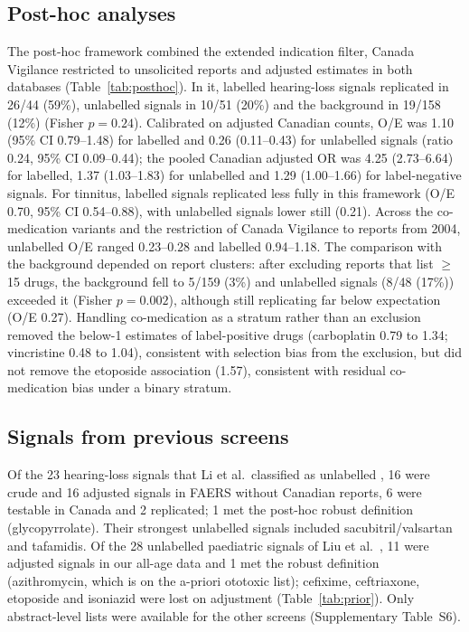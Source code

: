 \subsection{Post-hoc analyses}
The post-hoc framework combined the extended indication filter, Canada Vigilance restricted to unsolicited reports and
adjusted estimates in both databases (Table~\ref{tab:posthoc}). In it, labelled hearing-loss signals replicated in
26/44 (59\%), unlabelled signals in 10/51 (20\%) and the background in 19/158 (12\%)
(Fisher $p=0.24$). Calibrated on adjusted Canadian counts, O/E was 1.10 (95\% CI
0.79--1.48) for labelled and
0.26 (0.11--0.43)
for unlabelled signals (ratio 0.24, 95\% CI
0.09--0.44); the pooled
Canadian adjusted OR was 4.25 (2.73--6.64)
for labelled, 1.37 (1.03--1.83)
for unlabelled and 1.29 (1.00--1.66)
for label-negative signals. For tinnitus, labelled signals replicated less fully in this framework (O/E
0.70, 95\% CI 0.54--0.88),
with unlabelled signals lower still (0.21). Across the co-medication variants and the restriction of Canada Vigilance to reports from 2004,
unlabelled O/E ranged 0.23--0.28 and labelled
0.94--1.18. The comparison with the background depended on
report clusters: after excluding reports that list $\geq$15 drugs, the background fell to 5/159 (3\%) and
unlabelled signals (8/48 (17\%)) exceeded it (Fisher $p=0.002$),
although still replicating far below expectation (O/E 0.27). Handling
co-medication as a stratum rather than an exclusion removed the below-1 estimates of label-positive drugs (carboplatin
0.79 to 1.34; vincristine
0.48 to 1.04), consistent
with selection bias from the exclusion, but did not remove the etoposide association
(1.57), consistent with residual co-medication bias under a binary stratum.

\subsection{Signals from previous screens}
Of the 23 hearing-loss signals that Li et al.\ classified as unlabelled \cite{li2024},
16 were crude and 16 adjusted signals in FAERS without Canadian reports,
6 were testable in Canada and 2 replicated; 1
met the post-hoc robust definition (glycopyrrolate). Their strongest unlabelled signals included
sacubitril/valsartan and tafamidis. Of the 28 unlabelled paediatric signals of Liu et al.\ \cite{liu2025},
11 were adjusted signals in our all-age data and 1 met the robust definition
(azithromycin, which is on the a-priori ototoxic list);
cefixime, ceftriaxone, etoposide and isoniazid were lost on adjustment (Table~\ref{tab:prior}). Only
abstract-level lists were available for the other screens (Supplementary Table~S6).

